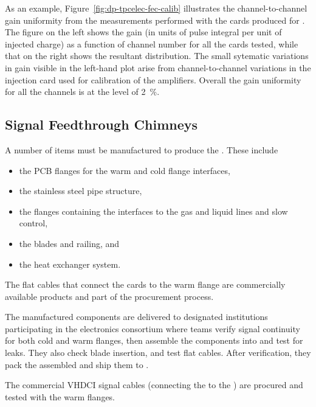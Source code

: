As an example, Figure~\ref{fig:dp-tpcelec-fec-calib} illustrates the channel-to-channel gain uniformity from the measurements performed with the  cards produced for . The figure on the %
left shows the gain (in units of pulse integral per unit of injected charge) as a function of channel number for all the cards tested, while that on the right shows the resultant distribution. The small sytematic variations in gain visible in the left-hand plot  arise from channel-to-channel variations in the injection card used for calibration of the  amplifiers. Overall the gain uniformity for all the channels is at the level of \SI{2}{\percent}.


\subsection{Signal Feedthrough Chimneys}
\label{ssec:dp-tpcelec-prod-sft}

A number of items must be manufactured to produce the . These include 
\begin{itemize}
\item the PCB flanges for the warm and cold \fdth flange interfaces, 
\item the stainless steel pipe structure, 
\item the flanges containing the interfaces to the gas and liquid lines and slow control, 
\item the blades and railing, and 
\item the heat exchanger system. 
\end{itemize}
The flat cables that connect the  cards to the warm flange are commercially available products and part of the  procurement process. 

The manufactured components are delivered to designated institutions participating in the \dual electronics consortium where teams verify signal continuity for both cold and warm flanges, then assemble the components into  and test for leaks. They also check blade insertion, and test flat cables.%
After verification, they pack the assembled  and ship them to . 

The commercial VHDCI signal cables (connecting the  to the ) are procured and tested with the  warm flanges.


